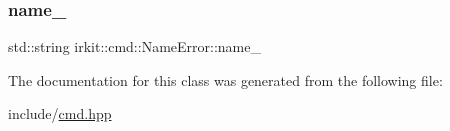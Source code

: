\mbox{\label{classirkit_1_1cmd_1_1NameError_ace25d86fda0c8803f7f59198fa550aa2}} 
\subsubsection{\texorpdfstring{name\+\_\+}{name\_}}
{\footnotesize\ttfamily std\+::string irkit\+::cmd\+::\+Name\+Error\+::name\+\_\+\hspace{0.3cm}{\ttfamily [protected]}}



The documentation for this class was generated from the following file\+:\begin{DoxyCompactItemize}
\item 
include/\mbox{\hyperlink{cmd_8hpp}{cmd.\+hpp}}\end{DoxyCompactItemize}
